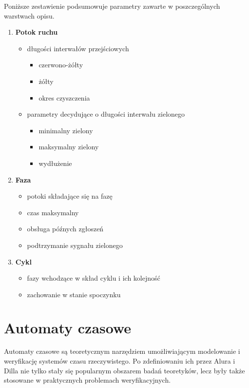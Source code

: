 \documentclass{pracamgr}
\theoremstyle{plain}
\begin{document}
Poniższe zestawienie podsumowuje parametry zawarte w poszczególnych
warstwach opisu.
\begin{enumerate}
  \item \textbf{Potok ruchu} 
  \begin{itemize}
    \item długości interwałów przejściowych
    \begin{itemize}
      \item czerwono-żółty
      \item żółty
      \item okres czyszczenia
    \end{itemize}
    \item parametry decydujące o długości interwału zielonego
    \begin{itemize}
      \item minimalny zielony
      \item maksymalny zielony
      \item wydłużenie
    \end{itemize}
  \end{itemize}
  \item \textbf{Faza}
  \begin{itemize}
    \item potoki składające się na fazę
    \item czas maksymalny
    \item obsługa późnych zgłoszeń
    \item podtrzymanie sygnału zielonego
  \end{itemize}
  \item \textbf{Cykl}
  \begin{itemize}
    \item fazy wchodzące w skład cyklu i ich kolejność
    \item zachowanie w stanie spoczynku
  \end{itemize}
\end{enumerate}

\chapter{Automaty czasowe}
\label{c:ta}
Automaty czasowe są teoretycznym narzędziem umożliwiającym modelowanie
i weryfikację systemów czasu rzeczywistego. Po zdefiniowaniu ich przez
Alura i Dilla \cite{alur-dill} nie tylko stały się popularnym obszarem
badań teoretyków, lecz były także stosowane w praktycznych problemach
weryfikacyjnych.
\end{document}
